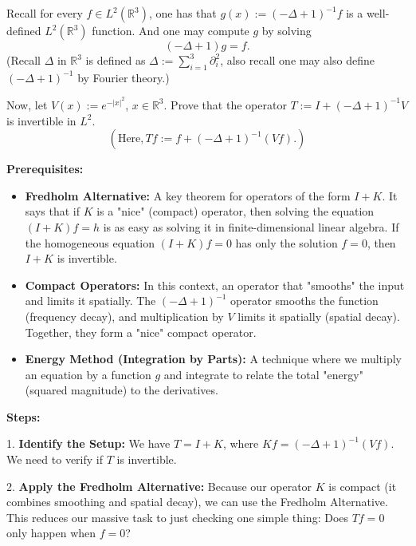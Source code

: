\begin{exercise}
\label{analysis:2024:2}
Recall for every $f\in L^2(\mathbb{R}^3)$, one has that $g(x) := (-\Delta+1)^{-1}f$ is a well-defined $L^2(\mathbb{R}^3)$ function. And one may compute $g$ by solving
\[
(-\Delta+1)g = f.
\]
(Recall $\Delta$ in $\mathbb{R}^3$ is defined as $\Delta := \sum_{i=1}^3 \partial_i^2$, also recall one may also define $(-\Delta+1)^{-1}$ by Fourier theory.)

Now, let $V(x) := e^{-|x|^2}$, $x\in\mathbb{R}^3$. Prove that the operator $T := I + (-\Delta+1)^{-1}V$ is invertible in $L^2$.
\[
\left(\text{Here}, Tf := f + (-\Delta+1)^{-1}(Vf).\right)
\]
\end{exercise}

\begin{solution}
\textbf{Prerequisites:}
\begin{itemize}
    \item \textbf{Fredholm Alternative:} A key theorem for operators of the form $I + K$. It says that if $K$ is a "nice" (compact) operator, then solving the equation $(I+K)f = h$ is as easy as solving it in finite-dimensional linear algebra. If the homogeneous equation $(I+K)f = 0$ has only the solution $f=0$, then $I+K$ is invertible.
    \item \textbf{Compact Operators:} In this context, an operator that "smooths" the input and limits it spatially. The $(-\Delta+1)^{-1}$ operator smooths the function (frequency decay), and multiplication by $V$ limits it spatially (spatial decay). Together, they form a "nice" compact operator.
    \item \textbf{Energy Method (Integration by Parts):} A technique where we multiply an equation by a function $g$ and integrate to relate the total "energy" (squared magnitude) to the derivatives.
\end{itemize}

\textbf{Steps:}

\par\vspace{\baselineskip}
1. \textbf{Identify the Setup:} We have $T = I + K$, where $K f = (-\Delta+1)^{-1}(Vf)$. We need to verify if $T$ is invertible.

\par\vspace{\baselineskip}
2. \textbf{Apply the Fredholm Alternative:} Because our operator $K$ is compact (it combines smoothing and spatial decay), we can use the Fredholm Alternative. This reduces our massive task to just checking one simple thing: Does $Tf = 0$ only happen when $f=0$?


\end{solution}
